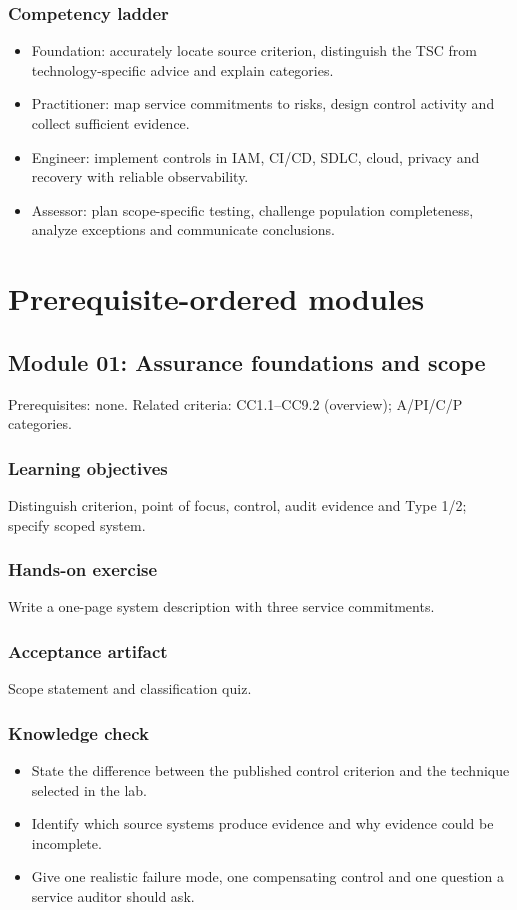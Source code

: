 \documentclass[10pt,oneside]{report}
\begin{document}
\subsection{Competency ladder}
\begin{itemize}
\item Foundation: accurately locate source criterion, distinguish the TSC from technology-specific advice and explain categories.
\item Practitioner: map service commitments to risks, design control activity and collect sufficient evidence.
\item Engineer: implement controls in IAM, CI/CD, SDLC, cloud, privacy and recovery with reliable observability.
\item Assessor: plan scope-specific testing, challenge population completeness, analyze exceptions and communicate conclusions.
\end{itemize}

\chapter{Prerequisite-ordered modules}
\section{Module 01: Assurance foundations and scope}
Prerequisites: none. Related criteria: CC1.1--CC9.2 (overview); A/PI/C/P categories.

\subsection{Learning objectives}
Distinguish criterion, point of focus, control, audit evidence and Type 1/2; specify scoped system.

\subsection{Hands-on exercise}
Write a one-page system description with three service commitments.

\subsection{Acceptance artifact}
Scope statement and classification quiz.

\subsection{Knowledge check}
\begin{itemize}
\item State the difference between the published control criterion and the technique selected in the lab.
\item Identify which source systems produce evidence and why evidence could be incomplete.
\item Give one realistic failure mode, one compensating control and one question a service auditor should ask.
\end{itemize}
\end{document}
